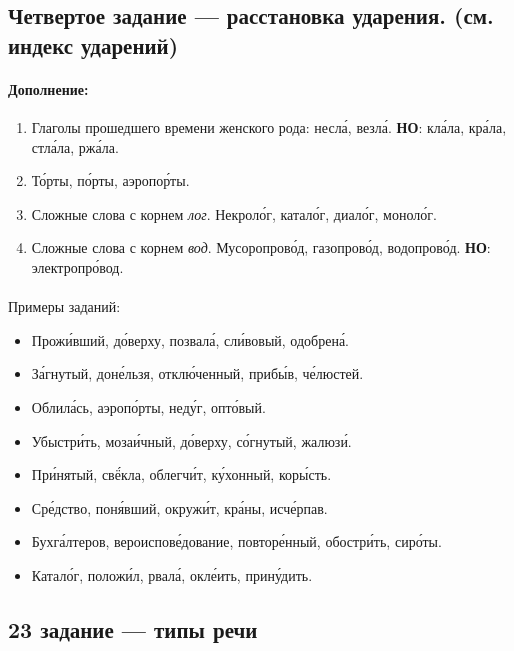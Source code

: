\documentclass{article}
\begin{document}
\subsection{Четвертое задание --- расстановка ударения. (см. индекс ударений)}

\paragraph{Дополнение:}
\begin{enumerate}
\item
  Глаголы прошедшего времени женского рода: несл\'{а}, везл\'{а}.
  \textbf{НО}: кл\'{а}ла, кр\'{а}ла, стл\'{а}ла, рж\'{а}ла.
\item
  Т\'{о}рты, п\'{о}рты, аэропо\'{р}ты.
\item
  Сложные слова с корнем \textit{лог}. Некрол\'{о}г, катал\'{о}г, диал\'{о}г, монол\'{о}г.
\item
  Сложные слова с корнем \textit{вод}. Мусоропров\'{о}д, газопров\'{о}д, водопров\'{о}д.
  \textbf{НО}: электропр\'{о}вод.
\end{enumerate}

\paragraph{} Примеры заданий: 

\begin{itemize}
\item
  Прож\'{и}вший, д\'{о}верху, позвал\'{а}, сл\'{и}вовый, одобрен\'{а}.
\item
  З\'{а}гнутый, дон\'{е}льзя, откл\'{ю}ченный, приб\'{ы}в, ч\'{е}люстей.
\item
  Облил\'{а}сь, аэроп\'{о}рты, нед\'{у}г, опт\'{о}вый.
\item
  Убыстр\'{и}ть, моза\'{и}чный, д\'{о}верху, с\'{о}гнутый, жалюз\'{и}.
\item
  Пр\'{и}нятый, св\'{ё}кла, облегч\'{и}т, к\'{у}хонный, кор\'{ы}сть.
\item
  Ср\'{е}дство, пон\'{я}вший, окруж\'{и}т, кр\'{а}ны, исч\'{е}рпав.
\item
  Бухг\'{а}лтеров, вероиспов\'{е}дование, повтор\'{е}нный, обостр\'{и}ть, сир\'{о}ты.
\item
  Катал\'{о}г, полож\'{и}л, рвал\'{а}, окл\'{е}ить, прин\'{у}дить.
\end{itemize}

\subsection{23 задание --- типы речи}
\end{document}
